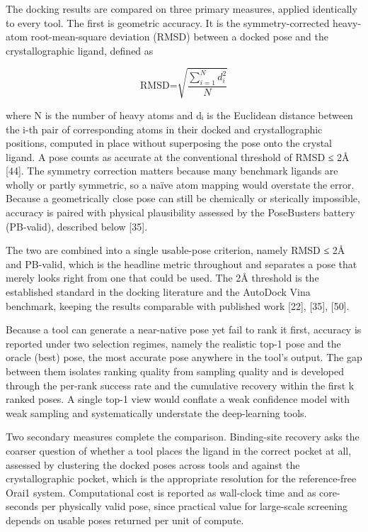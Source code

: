 The docking results are compared on three primary measures, applied identically to every tool. The first is geometric accuracy. It is the symmetry-corrected heavy-atom root-mean-square deviation (RMSD) between a docked pose and the crystallographic ligand, defined as

\[\text{RMSD=}\sqrt{\frac{\sum_{i = 1}^{N}d_{i}^{\text{2}}}{N}}\]

where N is the number of heavy atoms and dᵢ is the Euclidean distance between the i-th pair of corresponding atoms in their docked and crystallographic positions, computed in place without superposing the pose onto the crystal ligand. A pose counts as accurate at the conventional threshold of RMSD ≤ 2Å {[}44{]}. The symmetry correction matters because many benchmark ligands are wholly or partly symmetric, so a naïve atom mapping would overstate the error. Because a geometrically close pose can still be chemically or sterically impossible, accuracy is paired with physical plausibility assessed by the PoseBusters battery (PB-valid), described below {[}35{]}.

The two are combined into a single usable-pose criterion, namely RMSD ≤ 2Å and PB-valid, which is the headline metric throughout and separates a pose that merely looks right from one that could be used. The 2Å threshold is the established standard in the docking literature and the AutoDock Vina benchmark, keeping the results comparable with published work {[}22{]}, {[}35{]}, {[}50{]}.

Because a tool can generate a near-native pose yet fail to rank it first, accuracy is reported under two selection regimes, namely the realistic top-1 pose and the oracle (best) pose, the most accurate pose anywhere in the tool's output. The gap between them isolates ranking quality from sampling quality and is developed through the per-rank success rate and the cumulative recovery within the first k ranked poses. A single top-1 view would conflate a weak confidence model with weak sampling and systematically understate the deep-learning tools.

Two secondary measures complete the comparison. Binding-site recovery asks the coarser question of whether a tool places the ligand in the correct pocket at all, assessed by clustering the docked poses across tools and against the crystallographic pocket, which is the appropriate resolution for the reference-free Orai1 system. Computational cost is reported as wall-clock time and as core-seconds per physically valid pose, since practical value for large-scale screening depends on usable poses returned per unit of compute.

